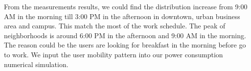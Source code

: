 From the measurements results, we could find the distribution increase from 9:00 AM in the morning till 
3:00 PM in the afternoon in downtown, urban business area and campus. 
This match the most of the work schedule.
The peak of neighborhoods is around 6:00 PM in the afternoon and 9:00 AM in the morning. 
The reason could be the users are looking for breakfast in the morning before go to work.
We input the user mobility pattern into our power consumption numerical simulation.



